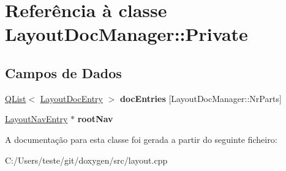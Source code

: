 \hypertarget{class_layout_doc_manager_1_1_private}{\section{Referência à classe Layout\-Doc\-Manager\-:\-:Private}
\label{class_layout_doc_manager_1_1_private}
}
\subsection*{Campos de Dados}
\begin{DoxyCompactItemize}
\item 
\hypertarget{class_layout_doc_manager_1_1_private_ab530148ddf48f2729282f71f44f4bd51}{\hyperlink{class_q_list}{Q\-List}$<$ \hyperlink{struct_layout_doc_entry}{Layout\-Doc\-Entry} $>$ {\bfseries doc\-Entries} \mbox{[}Layout\-Doc\-Manager\-::\-Nr\-Parts\mbox{]}}\label{class_layout_doc_manager_1_1_private_ab530148ddf48f2729282f71f44f4bd51}

\item 
\hypertarget{class_layout_doc_manager_1_1_private_aff6af61d72c0d71130656439b5b8d84a}{\hyperlink{struct_layout_nav_entry}{Layout\-Nav\-Entry} $\ast$ {\bfseries root\-Nav}}\label{class_layout_doc_manager_1_1_private_aff6af61d72c0d71130656439b5b8d84a}

\end{DoxyCompactItemize}


A documentação para esta classe foi gerada a partir do seguinte ficheiro\-:\begin{DoxyCompactItemize}
\item 
C\-:/\-Users/teste/git/doxygen/src/layout.\-cpp\end{DoxyCompactItemize}
